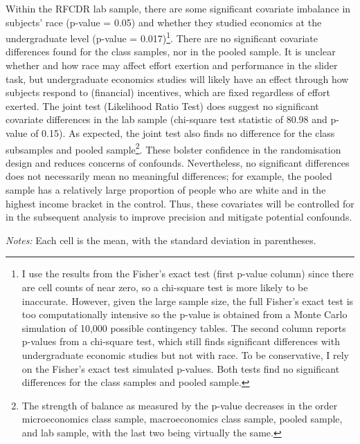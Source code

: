 \documentclass[12pt, letterpaper]{article}
\begin{document}
Within the RFCDR lab sample, there are some significant covariate imbalance in subjects' race (p-value = 0.05) and whether they studied economics at the undergraduate level (p-value = 0.017)\footnote{I use the results from the Fisher's exact test (first p-value column) since there are cell counts of near zero, so a chi-square test is more likely to be inaccurate. However, given the large sample size, the full Fisher's exact test is too computationally intensive so the p-value is obtained from a Monte Carlo simulation of 10,000 possible contingency tables. The second column reports p-values from a chi-square test, which still finds significant differences with undergraduate economic studies but not with race. To be conservative, I rely on the Fisher's exact test simulated p-values. Both tests find no significant differences for the class samples and pooled sample.}. There are no significant covariate differences found for the class samples, nor in the pooled sample. It is unclear whether and how race may affect effort exertion and performance in the slider task, but undergraduate economics studies will likely have an effect through how subjects respond to (financial) incentives, which are fixed regardless of effort exerted. The joint test (Likelihood Ratio Test) does suggest no significant covariate differences in the lab sample (chi-square test statistic of 80.98 and p-value of 0.15). As expected, the joint test also finds no difference for the class subsamples and pooled sample\footnote{The strength of balance as measured by the p-value decreases in the order microeconomics class sample, macroeconomics class sample, pooled sample, and lab sample, with the last two being virtually the same.}. These bolster confidence in the randomisation design and reduces concerns of confounds. Nevertheless, no significant differences does not necessarily mean no meaningful differences; for example, the pooled sample has a relatively large proportion of people who are white and in the highest income bracket in the control. Thus, these covariates will be controlled for in the subsequent analysis to improve precision and mitigate potential confounds.

\begin{table}
\centering
{\par}
{\par}
{\par}
{\par}
\smallskip
\begin{minipage}{\linewidth}
\footnotesize\textit{Notes:} Each cell is the mean, with the standard deviation in parentheses.
\end{minipage}
\caption{Summary of slider task performance metrics}\label{tab:slider-performance-sumstats}
\end{table}
\end{document}

